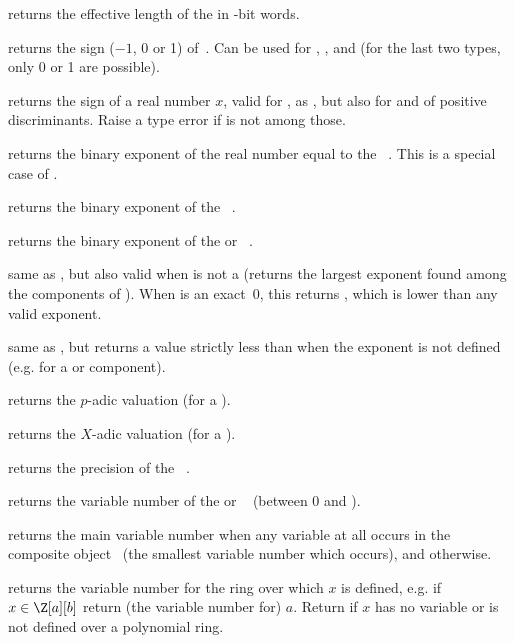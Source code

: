 returns the effective length of the 
 in \B-bit words.

 returns the sign ($-1$, 0 or 1) of~. Can be
used for , ,  and  (for the last two
types, only 0 or 1 are possible).

 returns the sign of a real number $x$,
valid for ,  as , but also for 
and  of positive discriminants. Raise a type error if 
is not among those.

 returns the binary exponent of the real number equal
to the ~. This is a special case of .

 returns the binary exponent of the
~.

 returns the binary exponent of the 
or ~.

 same as , but also valid when 
is not a  (returns the largest exponent found among the components
of ). When  is an exact~0, this returns
\hbox{}, which is lower than any valid exponent.

 same as , but returns a value
strictly less than \hbox{} when the exponent is not defined
(e.g. for a  or  component).

 returns the $p$-adic valuation (for
a ).

 returns the $X$-adic valuation (for a ).

 returns the precision of the ~.

 returns the variable number of the
 or ~ (between 0 and ).

 returns the main variable number when any variable
at all occurs in the composite object~ (the smallest variable number
which occurs), and  otherwise.

 returns the variable number for the ring over which
$x$ is defined, e.g. if $x\in \Z[a][b]$ return (the variable number for)
$a$. Return  if $x$ has no variable or is not defined over a
polynomial ring.

